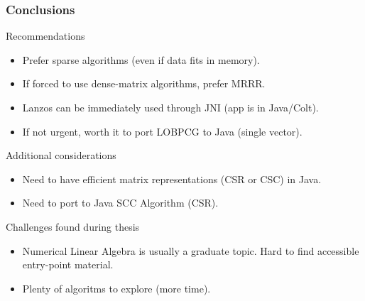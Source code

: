  \begin{frame}
  \frametitle{Conclusions}
  \begin{block}{Recommendations}
    \begin{itemize}
    \item Prefer sparse algorithms (even if data fits in memory).
    \item If forced to use dense-matrix algorithms, prefer MRRR.
    \item Lanzos can be immediately used through JNI (app is in Java/Colt).
    \item If not urgent, worth it to port LOBPCG to Java (single vector).
    \end{itemize}
  \end{block}
  \begin{block}{Additional considerations}
    \begin{itemize}
    \item Need to have efficient matrix representations (CSR or CSC) in Java.
    \item Need to port to Java SCC Algorithm (CSR).
    \end{itemize}
  \end{block}
  \begin{block}{Challenges found during thesis}
    \begin{itemize}
    \item Numerical Linear Algebra is usually a graduate topic. Hard to find accessible entry-point material.
    \item Plenty of algoritms to explore (more time).
    \end{itemize}
  \end{block}  
\end{frame}
